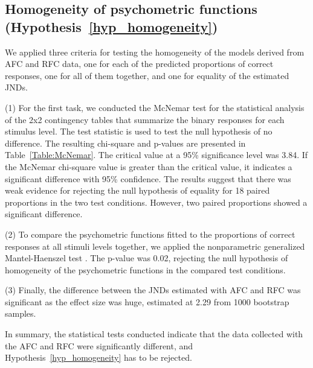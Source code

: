 \documentclass[a4paper,conference]{IEEEtran}
\begin{document}
\subsection{Homogeneity of psychometric functions (Hypothesis~\ref{hyp_homogeneity})}
We applied three criteria for testing the homogeneity of the models derived from AFC and RFC data, one for each of the predicted proportions of correct responses, one for all of them together, and one for equality of the estimated JNDs. 

\noindent (1) For the first task, we conducted the McNemar test for the statistical analysis of the 2x2 contingency tables that summarize the binary responses for each stimulus level. %
The test statistic is used to test the null hypothesis of no difference.
The resulting chi-square and p-values are presented in Table~\ref{Table:McNemar}. The critical value at a 95\% significance level was 3.84. If the McNemar chi-square value is greater than the critical value, it indicates a significant difference with 95\% confidence. 
The results suggest that there was weak evidence for rejecting the null hypothesis of equality for 18 paired proportions in the two test conditions. However, two paired proportions showed a significant difference.

\noindent (2) To compare the psychometric functions fitted to the proportions of correct responses at all stimuli levels together, we applied the nonparametric generalized Mantel-Haenszel test \cite{garcia2018nonparametric}. The p-value was 0.02, rejecting the null hypothesis of homogeneity of the psychometric functions in the compared test conditions.

\noindent (3) Finally, the difference between the JNDs estimated with AFC and RFC was significant as the effect size was huge, estimated at 2.29 from 1000 bootstrap samples. 

In summary, the statistical tests conducted indicate that the data collected with the AFC and RFC were significantly different, and Hypothesis~\ref{hyp_homogeneity} has to be rejected.

\end{document}
